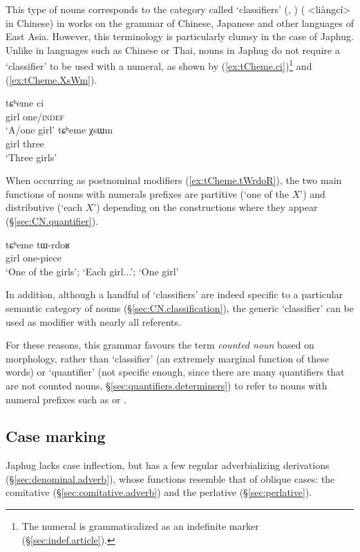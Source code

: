 This type of nouns corresponds to the category called `classifiers' (\citealt[518]{chao68chinese}, \citealt{aikhenvald00classifiers}) ( <liàngcí> in Chinese) in works on the grammar of Chinese, Japanese and other languages of East Asia. However, this terminology is particularly clumsy in the case of Japhug.  Unlike in languages such as Chinese or Thai, nouns in Japhug do not require a `classifier' to be used with a numeral, as shown by (\ref{ex:tCheme.ci})\footnote{The numeral  is grammaticalized as an indefinite marker (§\ref{sec:indef.article}).} and (\ref{ex:tCheme.XsWm}).


\begin{exe}
\ex \label{ex:tCheme.ci}
\gll tɕʰeme ci \\
girl one/\textsc{indef} \\
\glt `A/one girl'
\ex \label{ex:tCheme.XsWm}
\gll tɕʰeme χsɯm \\
girl three \\
\glt `Three girls'
\end{exe}

When occurring as postnominal modifiers (\ref{ex:tCheme.tWrdoR}), the two main functions of nouns with numerals prefixes are partitive (`one of the $X$') and distributive (`each $X$') depending on the constructions where they appear (§\ref{sec:CN.quantifier}). 

\begin{exe}
\ex \label{ex:tCheme.tWrdoR}
\gll tɕʰeme tɯ-rdoʁ \\
girl one-piece \\
\glt `One of the girls'; `Each girl...'; `One girl'
\end{exe}

In addition, although a handful of  `classifiers' are indeed specific to a particular semantic category of nouns (§\ref{sec:CN.classification}), the generic `classifier'  can be used as modifier with nearly all referents.

For these reasons, this grammar favours the term \textit{counted noun} based on morphology, rather than `classifier' (an extremely marginal function of these words) or `quantifier' (not specific enough, since there are many quantifiers that are not counted nouns, §\ref{sec:quantifiers.determiners}) to refer to nouns with numeral prefixes such as  or .

\subsection{Case marking} \label{sec:case.intro}
Japhug lacks case inflection, but has a few regular adverbializing derivations (§\ref{sec:denominal.adverb}), whose functions resemble that of oblique cases: the comitative  (§\ref{sec:comitative.adverb}) and the perlative (§\ref{sec:perlative}).

